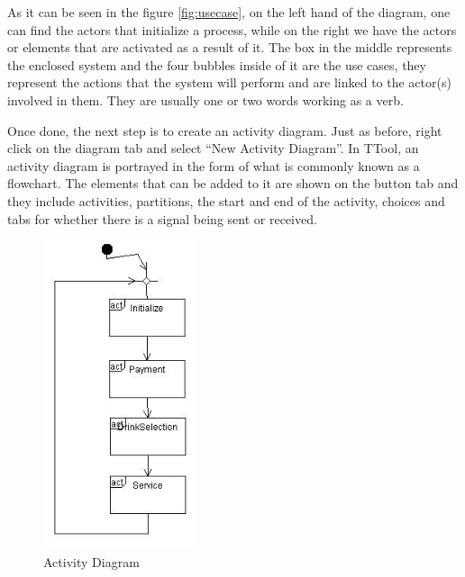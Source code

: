 \documentclass[12pt]{article}
\begin{document}
As it can be seen in the figure \ref{fig:usecase}, on the left hand of the diagram, one can find the actors that initialize a process, while on the right we have the actors or elements that are activated as a result of it. The box in the middle represents the enclosed system and the four bubbles inside of it are the use cases, they represent the actions that the system will perform and are linked to the actor(s) involved in them. They are usually one or two words working as a verb.

Once done, the next step is to create an activity diagram. Just as before, right click on the diagram tab and select “New Activity Diagram”.  In TTool, an activity diagram is portrayed in the form of what is commonly known as a flowchart. The elements that can be added to it are shown on the button tab and they include activities, partitions, the start and end of the activity, choices and tabs for whether there is a signal being sent or received. 

\begin{figure}[htbp]
\centering
\includegraphics[width=0.4\textwidth]{fig/actdiagram.jpg}
\caption{Activity Diagram} \label{fig:actdiagram}
\end{figure}
 
\end{document}
